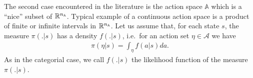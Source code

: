 \documentclass[a4paper,12pt]{amsart}
\newcommand{\actionSpace}{\mathbb A}
\newcommand{\actionSpaceAlg}{\mathcal A}
\newcommand{\stateValueFunc}{V}
\newcommand{\actionValueFunc}{Q}
\newcommand{\advantageFunc}{A}
\newcommand{\policy}{\pi}
\newcommand{\policyLik}{f}
\newcommand{\rewardFunc}{\phi}
\begin{document}
The second case encountered in the literature is the  action
space $\actionSpace$ which is a ``nice'' subset of $\R^{n_{\actionSpace}}$.
Typical example of a continuous action space is a product of finite or infinite
intervals in $\R^{n_{\actionSpace}}$. Let us assume that, for each state $s$, 
the measure $\policy(.|s)$ has a density $\policyLik(.|s)$, i.e.\ 
for an action set $\eta\in\actionSpaceAlg$ we have
\begin{align*}
    \policy(\eta | s) = \int_{\eta} \policyLik(a|s) da.
\end{align*}
As in the categorial case, we call $\policyLik(.|s)$ the likelihood function of the
measure $\policy(.|s)$.

%
%
\end{document}
